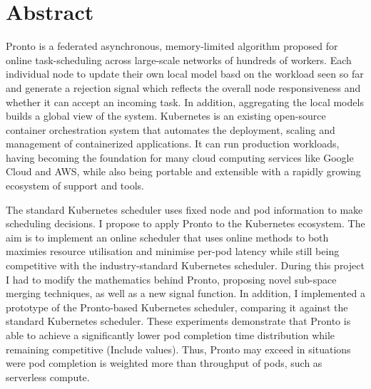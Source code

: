 \chapter*{Abstract}

Pronto is a federated asynchronous, memory-limited algorithm proposed for online
task-scheduling across large-scale networks of hundreds of workers. Each
individual node to update their own local model basd on the workload seen so far
and generate a rejection signal which reflects the overall node responsiveness
and whether it can accept an incoming task. In addition, aggregating the local
models builds a global view of the system. Kubernetes is an existing open-source
container orchestration system that automates the deployment, scaling and
management of containerized applications. It can run production workloads,
having becoming the foundation for many cloud computing services like Google
Cloud and AWS, while also being portable and extensible with a rapidly growing
ecosystem of support and tools.

The standard Kubernetes scheduler uses fixed node and pod information to make
scheduling decisions. I propose to apply Pronto to the Kubernetes ecosystem. The
aim is to implement an online scheduler that uses online methods to both
maximies resource utilisation and minimise per-pod latency while still being
competitive with the industry-standard Kubernetes scheduler. During this
project I had to modify the mathematics behind Pronto, proposing novel sub-space
merging techniques, as well as a new signal function. In addition, I implemented
a prototype of the Pronto-based Kubernetes scheduler, comparing it against the
standard Kubernetes scheduler. These experiments demonstrate that Pronto is
able to achieve a significantly lower pod completion time distribution while
remaining competitive (Include values). Thus, Pronto may exceed in situations
were pod completion is weighted more than throughput of pods, such as serverless
compute.
